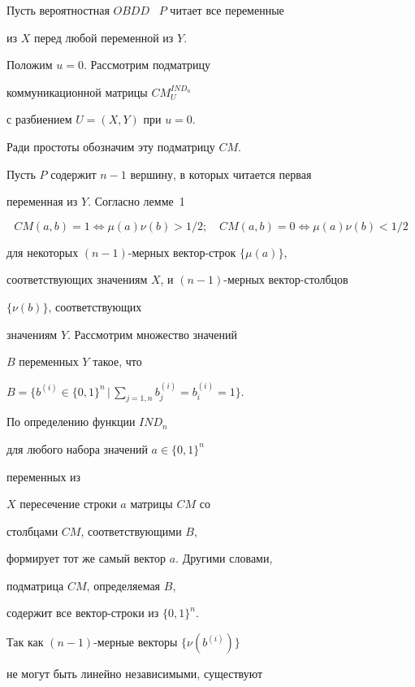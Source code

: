 \begin{pf}


Пусть вероятностная $OBDD$ \ $P$ читает все переменные


из $X$ перед любой переменной из $Y$.


Положим $u=0$. Рассмотрим подматрицу


коммуникационной матрицы $CM_U^{IND_n}$


с разбиением $U=(X,Y)$ при $u=0$.


Ради простоты обозначим эту подматрицу $CM$.


Пусть $P$ содержит $n-1$ вершину, в которых читается первая


переменная из $Y$. Согласно лемме~1


\begin{equation}


CM(a,b)=1\Leftrightarrow \mu(a)\nu(b)>1/2;\quad


CM(a,b)=0 \Leftrightarrow \mu(a)\nu(b)<1/2


\end{equation}


для некоторых $(n-1)$-мерных вектор-строк $\{\mu(a)\}$,


соответствующих значениям $X$, и $(n-1)$-мерных вектор-столбцов


$\{\nu(b)\}$, соответствующих


значениям $Y$. Рассмотрим множество значений


$B$ переменных $Y$ такое, что


$B=\Big\{b^{(i)}\in \{0,1\}^n\,\Big|\,


\sum\limits_{j=1,n}b^{(i)}_j=b^{(i)}_i=1\Big\}$.


По определению функции $IND_n$


для любого набора значений $a\in \{0,1\}^n$


переменных из


$X$ пересечение строки $a$ матрицы $CM$ со


столбцами $CM$, соответствующими $B$,


формирует тот же самый вектор $a$. Другими словами,


подматрица $CM$, определяемая $B$,


содержит все вектор-строки из $\{0,1\}^n$.





Так как $(n-1)$-мерные векторы $\{\nu(b^{(i)})\}$


не могут быть линейно независимыми, существуют



\end{pf}
